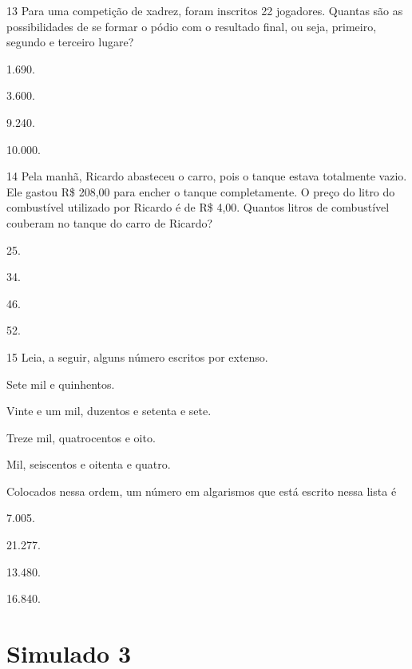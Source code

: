 \begin{mdframed}[linewidth=2pt,linecolor=salmao,roundcorner=2pt]
\begin{escolha}
{\begin{escolha}
\num{13} Para uma competição de xadrez, foram inscritos 22 jogadores. Quantas são
as possibilidades de se formar o pódio com o resultado final, ou seja,
primeiro, segundo e terceiro lugare?

\begin{escolha}
\item
  1.690.
\item
  3.600.
\item
  9.240.
\item
  10.000.
\end{escolha}


\num{14} Pela manhã, Ricardo abasteceu o carro, pois o tanque estava totalmente
vazio. Ele gastou R\$ 208,00 para encher o tanque completamente.
O preço do litro do combustível utilizado por Ricardo
é de R\$ 4,00. Quantos litros de combustível couberam no tanque do carro de
Ricardo?

\begin{escolha}
\item
  25.
\item
  34.
\item
  46.
\item
  52.
\end{escolha}


\num{15} Leia, a seguir, alguns número escritos por extenso.

\begin{mdframed}[linewidth=2pt,linecolor=azul!20,backgroundcolor=azul!20,roundcorner=2pt]
Sete mil e quinhentos.

Vinte e um mil, duzentos e setenta e sete.

Treze mil, quatrocentos e oito.

Mil, seiscentos e oitenta e quatro.
\end{mdframed}

Colocados nessa ordem, um número em algarismos que está escrito nessa lista é

\begin{escolha}
\item 7.005.
\item 21.277.
\item 13.480.
\item 16.840.
\end{escolha}

\chapter{Simulado 3}


\end{escolha}}
\end{escolha}
\end{mdframed}
